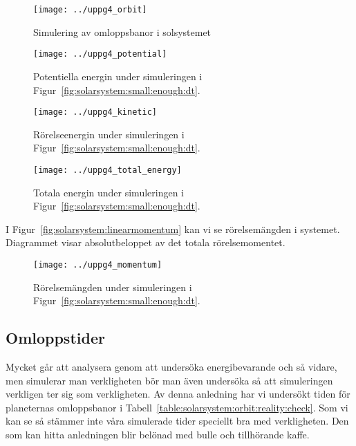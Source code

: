 \documentclass[a4]{article}
\begin{document}
\begin{figure}
\begin{center}
	\texttt{[image: ../uppg4\_orbit]}
\end{center}
\caption{Simulering av omloppsbanor i solsystemet}
\label{fig:solarsystem:small:enough:dt}
\end{figure}

\begin{figure}
\begin{center}
	\texttt{[image: ../uppg4\_potential]}
\end{center}
\caption{Potentiella energin under simuleringen i Figur~\vref{fig:solarsystem:small:enough:dt}.}
\label{fig:solarsystem:potential}
\end{figure}

\begin{figure}
\begin{center}
	\texttt{[image: ../uppg4\_kinetic]}
\end{center}
\caption{Rörelseenergin under simuleringen i Figur~\vref{fig:solarsystem:small:enough:dt}.}
\label{fig:solarsystem:kinetic}
\end{figure}

\begin{figure}
\begin{center}
	\texttt{[image: ../uppg4\_total\_energy]}
\end{center}
\caption{Totala energin under simuleringen i Figur~\vref{fig:solarsystem:small:enough:dt}.}
\label{fig:solarsystem:energy}
\end{figure}

I Figur~\vref{fig:solarsystem:linearmomentum} kan vi se rörelsemängden i systemet.
Diagrammet visar absolutbeloppet av det totala rörelsemomentet.
\begin{figure}
\begin{center}
	\texttt{[image: ../uppg4\_momentum]}
\end{center}
\caption{Rörelsemängden under simuleringen i Figur~\vref{fig:solarsystem:small:enough:dt}.}
\label{fig:solarsystem:linearmomentum}
\end{figure}


		\subsection{Omloppstider}
Mycket går att analysera genom att undersöka energibevarande och så vidare, men
simulerar man verkligheten bör man även undersöka så att simuleringen verkligen
ter sig som verkligheten.
Av denna anledning har vi undersökt tiden för planeternas omloppsbanor i
Tabell~\vref{table:solarsystem:orbit:reality:check}.
Som vi kan se så stämmer inte våra simulerade tider speciellt bra med
verkligheten.
Den som kan hitta anledningen blir belönad med bulle och tillhörande kaffe.
\end{document}
